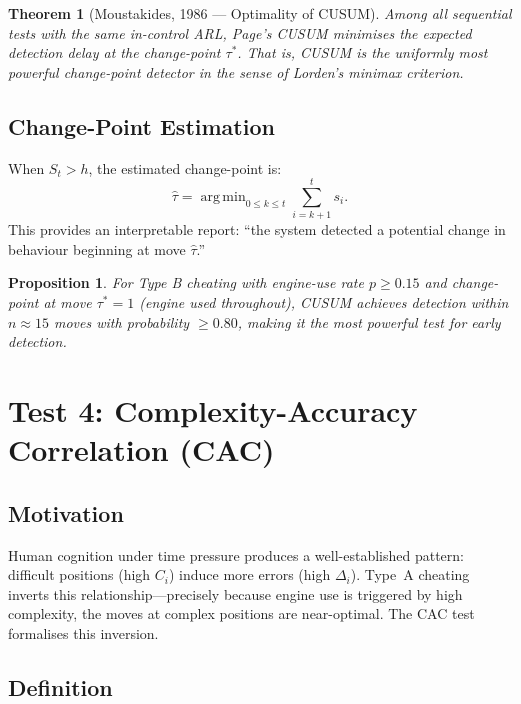 \documentclass[11pt,a4paper]{article}
\newtheorem{proposition}{Proposition}
\newtheorem{theorem}{Theorem}
\DeclareMathOperator*{\argmin}{arg\,min}
\begin{document}
\begin{theorem}[Moustakides, 1986 --- Optimality of CUSUM]
Among all sequential tests with the same in-control ARL, Page's CUSUM
minimises the expected detection delay at the change-point $\tau^*$.
That is, CUSUM is the \emph{uniformly most powerful} change-point detector
in the sense of Lorden's minimax criterion.
\end{theorem}

\subsection{Change-Point Estimation}

When $S_t > h$, the estimated change-point is:
\begin{equation}
  \hat{\tau} = \argmin_{0 \leq k \leq t} \sum_{i=k+1}^{t} s_i.
  \label{eq:changepoint_estimate}
\end{equation}
This provides an interpretable report: ``the system detected a potential
change in behaviour beginning at move $\hat{\tau}$.''

\begin{proposition}
\label{prop:cusum_power}
For Type B cheating with engine-use rate $p \geq 0.15$ and change-point
at move $\tau^* = 1$ (engine used throughout), CUSUM achieves detection
within $n \approx 15$ moves with probability $\geq 0.80$, making it the
most powerful test for early detection.
\end{proposition}

\section{Test 4: Complexity-Accuracy Correlation (CAC)}
\label{sec:cac}

\subsection{Motivation}

Human cognition under time pressure produces a well-established pattern:
difficult positions (high $C_i$) induce more errors (high $\Delta_i$).
Type~A cheating inverts this relationship---precisely because engine use
is triggered by high complexity, the moves at complex positions are
near-optimal. The CAC test formalises this inversion.

\subsection{Definition}
\end{document}
